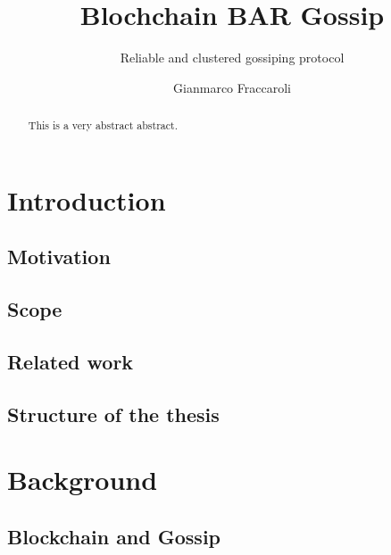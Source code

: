 \documentclass[mscthesis]{usiinfthesis}
\title{Blochchain BAR Gossip} %
\subtitle{Reliable and clustered gossiping protocol} %
\author{Gianmarco Fraccaroli} %
\begin{document}
\maketitle %

\frontmatter %

\begin{abstract}
This is a very abstract abstract. 

\lipsum
\end{abstract}



\begin{acknowledgements}
\lipsum 
\end{acknowledgements}

\tableofcontents 
\listoffigures %
\listoftables %

\mainmatter

\chapter{Introduction}
\section{Motivation}
\section{Scope}
\section{Related work}
\section{Structure of the thesis}

\chapter{Background}
\section{Blockchain and Gossip}
\end{document}
